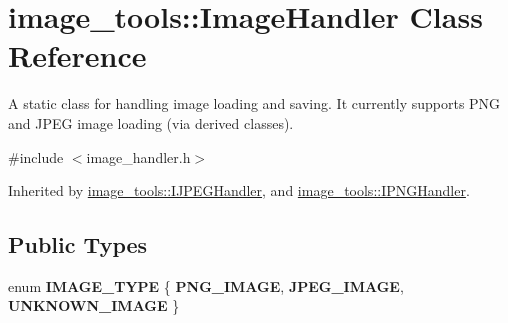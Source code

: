 \hypertarget{classimage__tools_1_1ImageHandler}{}\section{image\+\_\+tools\+:\+:Image\+Handler Class Reference}
\label{classimage__tools_1_1ImageHandler}


A static class for handling image loading and saving. It currently supports P\+NG and J\+P\+EG image loading (via derived classes).  




{\ttfamily \#include $<$image\+\_\+handler.\+h$>$}



Inherited by \hyperlink{classimage__tools_1_1IJPEGHandler}{image\+\_\+tools\+::\+I\+J\+P\+E\+G\+Handler}, and \hyperlink{classimage__tools_1_1IPNGHandler}{image\+\_\+tools\+::\+I\+P\+N\+G\+Handler}.

\subsection*{Public Types}
\begin{DoxyCompactItemize}
\item 
enum {\bfseries I\+M\+A\+G\+E\+\_\+\+T\+Y\+PE} \{ {\bfseries P\+N\+G\+\_\+\+I\+M\+A\+GE}, 
{\bfseries J\+P\+E\+G\+\_\+\+I\+M\+A\+GE}, 
{\bfseries U\+N\+K\+N\+O\+W\+N\+\_\+\+I\+M\+A\+GE}
 \}\hypertarget{classimage__tools_1_1ImageHandler_a1ad849e8783b00364ed9353861540868}{}\label{classimage__tools_1_1ImageHandler_a1ad849e8783b00364ed9353861540868}

\end{DoxyCompactItemize}
